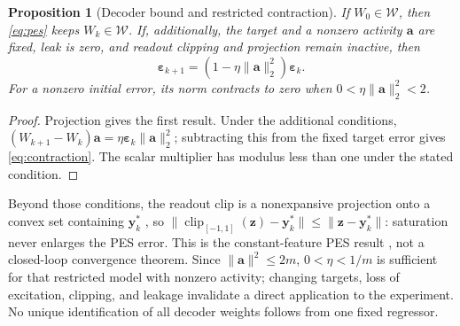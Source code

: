 \documentclass[letterpaper, 10 pt, conference]{ieeeconf}
\newcommand{\clip}{\operatorname{clip}}
\newtheorem{proposition}{Proposition}
\newtheorem{remark}{Remark}
\begin{document}
\begin{proposition}[Decoder bound and restricted contraction]
\label{prop:pes}
If $W_0\in\mathcal W$, then \eqref{eq:pes} keeps $W_k\in\mathcal W$.
If, additionally, the target and a nonzero activity $\bm a$ are fixed,
leak is zero, and readout clipping and projection remain inactive, then
\begin{equation}
 \bm\varepsilon_{k+1}
       =(1-\eta\|\bm a\|_2^2)\bm\varepsilon_k.
 \label{eq:contraction}
\end{equation}
For a nonzero initial error, its norm contracts to zero when
$0<\eta\|\bm a\|_2^2<2$.
\end{proposition}
\begin{proof}
Projection gives the first result. Under the additional conditions,
$(W_{k+1}-W_k)\bm a=\eta\bm\varepsilon_k\|\bm a\|_2^2$;
subtracting this from the fixed target error gives
\eqref{eq:contraction}. The scalar multiplier has modulus less than one
under the stated condition.
\end{proof}
Beyond those conditions, the readout clip is a nonexpansive projection onto
a convex set containing $\bm y_k^*$ \cite{bauschke2017convex}, so
$\|\clip_{[-1,1]}(\bm z)-\bm y_k^*\|\le\|\bm z-\bm y_k^*\|$: saturation never
enlarges the PES error.
This is the constant-feature PES result \cite{voelker2015pes}, not a
closed-loop convergence theorem. Since $\|\bm a\|^2\le2m$,
$0<\eta<1/m$ is sufficient for that restricted model with nonzero
activity; changing targets, loss of excitation, clipping, and leakage
invalidate a direct application to the experiment. No unique identification
of all decoder weights follows from one fixed regressor.

\end{document}
